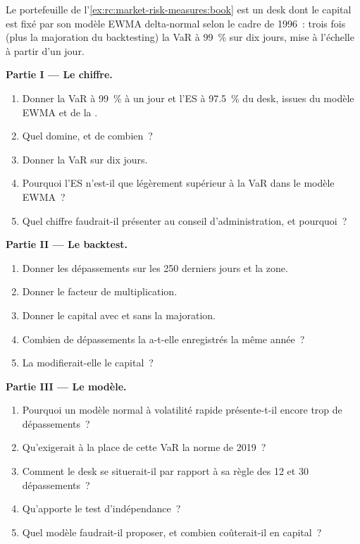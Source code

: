 \begin{problem}\label{pb:rc:market-risk-measures:1}
Le portefeuille de l'\cref{ex:rc:market-risk-measures:book} est un desk dont le capital est fixé par son modèle EWMA
delta-normal selon le cadre de 1996~: trois fois (plus la majoration du backtesting) la VaR
à 99~\% sur dix jours, mise à l'échelle à partir d'un jour.

\medskip\noindent\textbf{Partie I --- Le chiffre.}
\begin{enumerate}
\item Donner la VaR à 99~\% à un jour et l'ES à 97.5~\% du desk, issues du modèle EWMA et de la
.
\item Quel  domine, et de combien~?
\item Donner la VaR sur dix jours.
\item Pourquoi l'ES n'est-il que légèrement supérieur à la VaR dans le modèle EWMA~?
\item Quel chiffre faudrait-il présenter au conseil d'administration, et pourquoi~?
\end{enumerate}

\medskip\noindent\textbf{Partie II --- Le backtest.}
\begin{enumerate}[resume]
\item Donner les dépassements sur les 250 derniers jours et la zone.
\item Donner le facteur de multiplication.
\item Donner le capital avec et sans la majoration.
\item Combien de dépassements la  a-t-elle enregistrés la même année~?
\item La  modifierait-elle le capital~?
\end{enumerate}

\medskip\noindent\textbf{Partie III --- Le modèle.}
\begin{enumerate}[resume]
\item Pourquoi un modèle normal à volatilité rapide présente-t-il encore trop de dépassements~?
\item Qu'exigerait à la place de cette VaR la norme de 2019~?
\item Comment le desk se situerait-il par rapport à sa règle des 12 et 30 dépassements~?
\item Qu'apporte le test d'indépendance~?
\item Quel modèle faudrait-il proposer, et combien coûterait-il en capital~?
\end{enumerate}


\end{problem}

